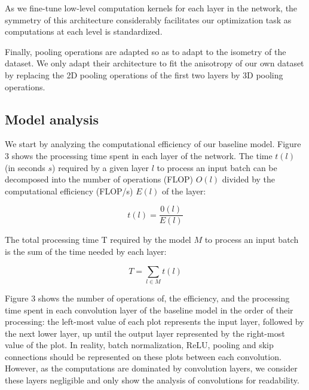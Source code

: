 \documentclass[runningheads]{llncs}
\begin{document}
As we fine-tune low-level computation kernels for each layer in the network,
the symmetry of this architecture considerably facilitates our optimization task
as computations at each level is standardized.

Finally, pooling operations are adapted so as to adapt to the isometry of the dataset.
We only adapt their architecture to fit the anisotropy of our own dataset by 
replacing the 2D pooling operations of the first two layers by 3D pooling operations.

\subsection{Model analysis}

We start by analyzing the computational efficiency of our baseline model.
Figure 3 shows the processing time spent in each layer of the network.
The time $t(l)$ (in seconds $s$) required by a given layer $l$ to process an input batch 
can be decomposed into the number of operations (FLOP) $O(l)$ divided by the computational efficiency (FLOP/s) $E(l)$ of the layer:

$$t(l) = \frac{0(l)}{E(l)} $$

The total processing time T required by the model $M$ to process an input batch is the sum of the time needed by each layer:

$$T = \sum_{l \in M} t(l)$$

Figure 3 shows the number of operations of, the efficiency, and the processing time spent in each convolution layer of the baseline model in the order of their processing: 
the left-most value of each plot represents the input layer, followed by the next lower layer, up until the output layer represented by the right-most value of the plot.
In reality, batch normalization, ReLU, pooling and skip connections should be represented on these plots between each convolution.
However, as the computations are dominated by convolution layers, we consider these layers negligible and only show the analysis of convolutions for readability. 
\end{document}
